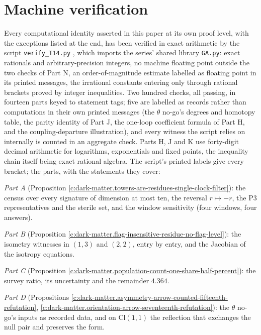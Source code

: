 \documentclass[11pt]{article}
\theoremstyle{definition}
\theoremstyle{plain}
\providecommand{\Cl}{}\renewcommand{\Cl}{\mathrm{Cl}}
\begin{document}
\section{Machine verification}

\label{c:note.dark-matter.setting-machine-verification}
Every computational identity asserted in this paper at its own proof level, with the exceptions listed at the end, has been verified in exact arithmetic by the script \texttt{verify\_T14.py} \cite{ButlerVerifyT14}, which imports the series' shared library \texttt{GA.py}: exact rationals and arbitrary-precision integers, no machine floating point outside the two checks of Part N, an order-of-magnitude estimate labelled as floating point in its printed messages, the irrational constants entering only through rational brackets proved by integer inequalities. Two hundred checks, all passing, in fourteen parts keyed to statement tags; five are labelled as records rather than computations in their own printed messages (the $\theta$ no-go's degrees and homotopy table, the parity identity of Part J, the one-loop coefficient formula of Part H, and the coupling-departure illustration), and every witness the script relies on internally is counted in an aggregate check. Parts H, J and K use forty-digit decimal arithmetic for logarithms, exponentials and fixed points, the inequality chain itself being exact rational algebra. The script's printed labels give every bracket; the parts, with the statements they cover:

\emph{Part A} (Proposition \ref{c:dark-matter.towers-are-residues-single-clock-filter}): the census over every signature of dimension at most ten, the reversal $r \mapsto -r$, the P3 representatives and the sterile set, and the window sensitivity (four windows, four answers).

\emph{Part B} (Proposition \ref{c:dark-matter.flag-insensitive-residue-no-flag-level}): the isometry witnesses in $(1,3)$ and $(2,2)$, entry by entry, and the Jacobian of the isotropy equations.

\emph{Part C} (Proposition \ref{c:dark-matter.population-count-one-share-half-percent}): the survey ratio, its uncertainty and the remainder $4.364$.

\emph{Part D} (Propositions \ref{c:dark-matter.asymmetry-arrow-counted-fifteenth-refutation}, \ref{c:dark-matter.orientation-arrow-seventeenth-refutation}): the $\theta$ no-go's inputs as recorded data, and on $\Cl(1,1)$ the reflection that exchanges the null pair and preserves the form.
\end{document}
